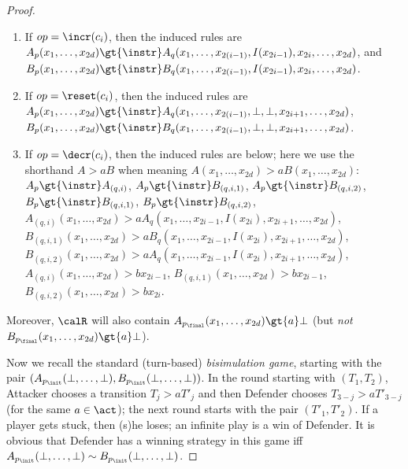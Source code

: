 \documentclass[a4paper,11pt]{article}
\begin{document}
\begin{proof}
\begin{enumerate}
		\item
If $op=\incr(c_i)$, then the induced rules are
\\
$A_p(x_1,\dots,x_{2d})\gt{\instr}A_q(x_1,\dots,x_{2(i-1)},
I(x_{2i-1}), x_{2i},\dots,x_{2d})$, and
\\
$B_p(x_1,\dots,x_{2d})\gt{\instr}B_q(x_1,\dots,x_{2(i-1)},
I(x_{2i-1}), x_{2i},\dots,x_{2d})$.
\item
If $op=\reset(c_i)$, then the induced rules are
\\
$A_p(x_1,\dots,x_{2d})\gt{\instr}A_q(x_1,\dots,x_{2(i-1)},
\bot,\bot,x_{2i+1},\dots,x_{2d})$,
\\
$B_p(x_1,\dots,x_{2d})\gt{\instr}B_q(x_1,\dots,x_{2(i-1)},
\bot,\bot,x_{2i+1},\dots,x_{2d})$.
\item
If $op=\decr(c_i)$, then the induced rules are below;
here we use the shorthand $A\gt{a}B$ when meaning 
$A(x_1,\dots,x_{2d})\gt{a}B(x_1,\dots,x_{2d})$:
\\
$A_p\gt{\instr}A_{(q,i)}$,
$A_p\gt{\instr}B_{(q,i,1)}$,
$A_p\gt{\instr}B_{(q,i,2)}$,
$B_p\gt{\instr}B_{(q,i,1)}$,
$B_p\gt{\instr}B_{(q,i,2)}$,
\\
$A_{(q,i)}(x_1,\dots,x_{2d})\gt{a}A_q(x_1,\dots,x_{2i-1},I(x_{2i}),
x_{2i+1},\dots,x_{2d})$,
\\
$B_{(q,i,1)}(x_1,\dots,x_{2d})\gt{a}B_q(x_1,\dots,x_{2i-1},I(x_{2i}),
x_{2i+1},\dots,x_{2d})$,
\\
$B_{(q,i,2)}(x_1,\dots,x_{2d})\gt{a}A_q(x_1,\dots,x_{2i-1},I(x_{2i}),
x_{2i+1},\dots,x_{2d})$,
\\
$A_{(q,i)}(x_1,\dots,x_{2d})\gt{b}x_{2i-1}$,
$B_{(q,i,1)}(x_1,\dots,x_{2d})\gt{b}x_{2i-1}$,
$B_{(q,i,2)}(x_1,\dots,x_{2d})\gt{b}x_{2i}$.
\end{enumerate}
Moreover, $\calR$ will also contain
$A_{p_\final}(x_1,\dots,x_{2d})\gt{a}\bot$ 
(but \emph{not} $B_{p_\final}(x_1,\dots,x_{2d})\gt{a}\bot$). 

Now we recall the standard (turn-based) \emph{bisimulation game}, starting
with the pair
$(A_{p_\init}(\bot,\dots,\bot),B_{p_\init}(\bot,\dots,\bot))$.
In the round starting with $(T_1,T_2)$, Attacker chooses a transition
$T_j\gt{a}T'_j$ and then Defender chooses $T_{3-j}\gt{a}T'_{3-j}$ (for
the same $a\in\act$); the
next round starts with the pair $(T'_1,T'_2)$. If a player gets
stuck, then (s)he loses; an infinite play is a win of Defender.
It is obvious that Defender has a winning strategy in this game iff 
$A_{p_\init}(\bot,\dots,\bot)\sim B_{p_\init}(\bot,\dots,\bot)$.


\end{proof}
\end{document}
